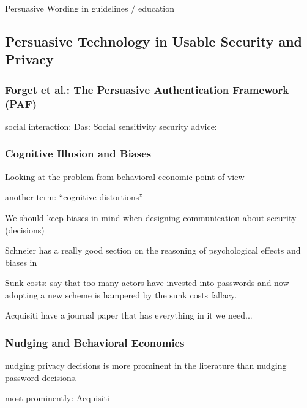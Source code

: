 	Persuasive Wording in guidelines / education \cite{Zakaria2013DesigningEffectiveSecurityMessages}
	
	\subsection{Persuasive Technology in Usable Security and Privacy}
	
	\subsubsection{Forget et al.: The Persuasive Authentication Framework (PAF)}
	social interaction: Das: Social sensitivity security advice: \cite{Das2014EffectSocialInfluenceSecuritySensitivity}
	
	\subsubsection{Cognitive Illusion and Biases}
	Looking at the problem from behavioral economic point of view
	
	another term: ``cognitive distortions''
	
	We should keep biases in mind when designing communication about security (decisions) \cite{Garg2013HeuristicsAndBiases}
	
	Schneier has a really good section on the reasoning of psychological effects and biases in \cite{Schneier2008PsychologySecurity} 
	
	Sunk costs: \cite{Herley2012PersistenceOfPasswords} say that too many actors have invested into passwords and now adopting a new scheme is hampered by the sunk costs fallacy.
	
	
	Acquisiti \etal \cite{Acquisti2017NudgesPrivacySecurity} have a journal paper that has everything in it we need...
	
	
	
	\subsubsection{Nudging and Behavioral Economics}
		
		
		nudging privacy decisions is more prominent in the literature than nudging password decisions. 
		
		
		most prominently: Acquisiti \etal \cite{Acquisti2017NudgesPrivacySecurity} \cite{Acquisti2005PrivacyRationality}
	
